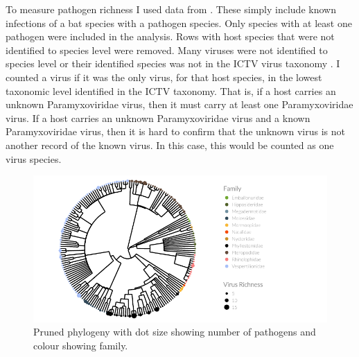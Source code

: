 To measure pathogen richness I used data from \cite{luis2013comparison}. 
These simply include known infections of a bat species with a pathogen species. 
Only species with at least one pathogen were included in the analysis.
Rows with host species that were not identified to species level were removed.
Many viruses were not identified to species level or their identified species was not in the ICTV virus taxonomy \cite{ICTV}.
I counted a virus if it was the only virus, for that host species, in the lowest taxonomic level identified in the ICTV taxonomy.
That is, if a host carries an unknown Paramyxoviridae virus, then it must carry at least one Paramyxoviridae virus.
If a host carries an unknown Paramyxoviridae virus and a known Paramyxoviridae virus, then it is hard to confirm that the unknown virus is not another record of the known virus.
In this case, this would be counted as one virus species.






\begin{knitrout}\footnotesize
{}\color{fgcolor}\begin{figure}[t]

{\centering \includegraphics[width=\textwidth]{figure/treePlot-1} 

}

\caption[Pruned phylogeny with dot size showing number of pathogens and colour showing family]{Pruned phylogeny with dot size showing number of pathogens and colour showing family.}\label{fig:treePlot}
\end{figure}


\end{knitrout}












